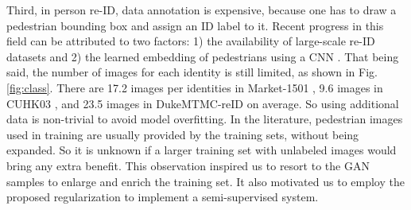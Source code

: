 \documentclass[10pt,twocolumn,letterpaper]{article}
\begin{document}
Third, in person re-ID, data annotation is expensive, because one has to draw a pedestrian bounding box and assign an ID label to it. Recent progress in this field can be attributed to two factors: 1) the availability of large-scale re-ID datasets \cite{zheng2015scalable,zheng2016person,xiao2016end,li2014deepreid} and 2) the learned embedding of pedestrians using a CNN \cite{cheng2016person,geng2016deep}. That being said, the number of images for each identity is still limited, as shown in Fig. \ref{fig:class}. There are 17.2 images per identities in Market-1501 \cite{zheng2015scalable}, 9.6 images in CUHK03 \cite{li2014deepreid}, and 23.5 images in DukeMTMC-reID \cite{ristani2016MTMC} on average. So using additional data is non-trivial to avoid model overfitting. In the literature, pedestrian images used in training are usually provided by the training sets, without being expanded. So it is unknown if a larger training set with unlabeled images would bring any extra benefit. This observation inspired us to resort to the GAN samples to enlarge and enrich the training set. It also motivated us to employ the proposed regularization to implement a semi-supervised system. 

 
\end{document}
